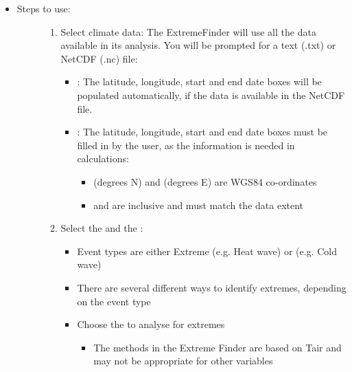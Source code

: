 \documentclass[letterpaper,10pt,english]{sphinxmanual}
\begin{document}
\begin{itemize}
\item {} \begin{description}
\item[{Steps to use:}] \leavevmode\begin{enumerate}
\item {} 
Select climate data: The ExtremeFinder will use all the data available in its analysis. You will be prompted for a text (.txt) or NetCDF (.nc) file:
\begin{itemize}
\item {} 
: The latitude, longitude, start and end date boxes will be populated automatically, if the data is available in the NetCDF file.

\item {} 
: The latitude, longitude, start and end date boxes must be filled in by the user, as the information is needed in calculations:
\begin{itemize}
\item {} 
 (degrees N) and  (degrees E) are WGS84 co-ordinates

\item {} 
 and  are inclusive and must match the data extent

\end{itemize}

\end{itemize}

\item {} 
Select the  and the :
\begin{itemize}
\item {} 
Event types are either Extreme  (e.g. Heat wave) or  (e.g. Cold wave)

\item {} 
There are several different ways to identify extremes, depending on the event type

\item {} 
Choose the  to analyse for extremes
\begin{itemize}
\item {} 
 The methods in the Extreme Finder are based on Tair and may not be appropriate for other variables


\end{itemize}
\end{itemize}
\end{enumerate}
\end{description}
\end{itemize}
\end{document}

